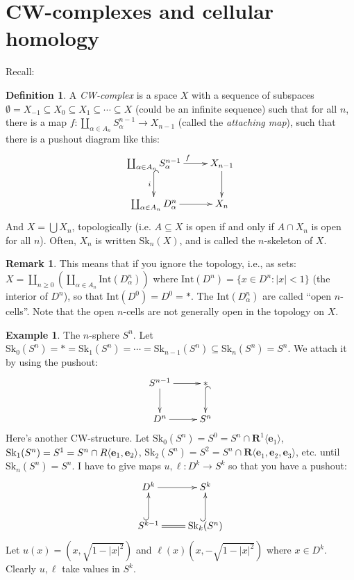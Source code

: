 \documentclass{amsart}
\theoremstyle{theorem}
\theoremstyle{definition}
\newtheorem{definition}[theorem]{Definition}
\newtheorem{remark}[theorem]{Remark}
\newtheorem{example}[theorem]{Example}
\begin{document}
\section{CW-complexes and cellular homology}
Recall:
\begin{definition}
A \emph{CW-complex} is a space $X$ with a sequence of subspaces $\emptyset=X_{-1}\subseteq X_0\subseteq X_1\subseteq\cdots\subseteq X$ (could be an infinite sequence) such that for all $n$, there is a map $f:\coprod_{\alpha\in A_n}S^{n-1}_\alpha\to X_{n-1}$ (called the \emph{attaching map}), such that there is a pushout diagram like this:
\begin{equation*}
\xymatrix{\coprod_{\alpha\in A_n}S^{n-1}_\alpha\ar[r]^f\ar@{^(->}[d]_i & X_{n-1}\ar[d]\\
\coprod_{\alpha\in A_n}D^n_\alpha\ar[r] & X_{n}}
\end{equation*}
And $X=\bigcup X_n$, topologically (i.e. $A\subseteq X$ is open if and only if $A\cap X_n$ is open for all $n$). Often, $X_n$ is written $\mathrm{Sk}_n(X)$, and is called the $n$-skeleton of $X$.
\end{definition}
\begin{remark}
This means that if you ignore the topology, i.e., as sets: $X=\coprod_{n\geq 0}\left(\coprod_{\alpha\in A_n}\mathrm{Int}(D^n_\alpha)\right)$ where $\mathrm{Int}(D^n)=\{x\in D^n: |x|<1\}$ (the interior of $D^n$), so that $\mathrm{Int}(D^0)=D^0=\ast$. The $\mathrm{Int}(D^n_\alpha)$ are called ``open $n$-cells''. Note that the open $n$-cells are not generally open in the topology on $X$.
\end{remark}
\begin{example}
The $n$-sphere $S^n$. Let $\mathrm{Sk}_0(S^n)=\ast=\mathrm{Sk}_1(S^n)=\cdots=\mathrm{Sk}_{n-1}(S^n)\subseteq \mathrm{Sk}_n(S^n)=S^n$. We attach it by using the pushout:
\begin{equation*}
\xymatrix{S^{n-1}\ar[d]\ar[r] & \ast\ar@{^(->}[d]\\
D^n\ar[r] & S^n}
\end{equation*}
Here's another CW-structure. Let $\mathrm{Sk}_0(S^n)=S^0=S^n\cap \mathbf{R}^1\langle \mathbf{e}_1\rangle$, $\mathrm{Sk}_1(S^n)=S^{1}=S^n\cap\mathbf\mathbf{R}\langle \mathbf{e}_1,\mathbf{e}_2\rangle$, $\mathrm{Sk}_2(S^n)=S^2=S^n\cap\mathbf{R}\langle \mathbf{e}_1,\mathbf{e}_2,\mathbf{e}_3\rangle$, etc. until $\mathrm{Sk}_n(S^n)=S^n$. I have to give maps $u,\ell:D^k\to S^k$ so that you have a pushout:
\begin{equation*}
\xymatrix{D^k\ar[r] & S^k\\
S^{k-1}\ar@{^(->}[u]\ar@{=}[r] & \mathrm{Sk}_k(S^n)\ar@{^(->}[u]}
\end{equation*}
Let $u(x)=(x,\sqrt{1-|x|^2})$ and $\ell(x)(x,-\sqrt{1-|x|^2})$ where $x\in D^k$. Clearly $u,\ell$ take values in $S^k$.
\end{example}
\end{document}
